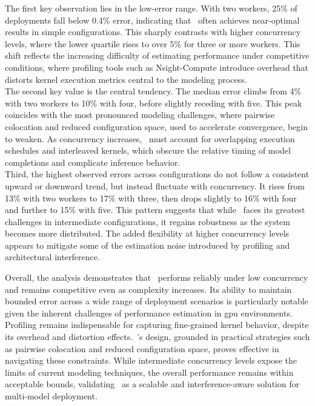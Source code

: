 The first key observation lies in the low-error range. With two workers, 25\% of deployments fall below 0.4\% error, indicating that~\roomie{} often achieves near-optimal results in simple configurations. This sharply contrasts with higher concurrency levels, where the lower quartile rises to over 5\% for three or more workers. This shift reflects the increasing difficulty of estimating performance under competitive conditions, where profiling tools such as Nsight-Compute introduce overhead that distorts kernel execution metrics central to the modeling process.\\
The second key value is the central tendency. The median error climbs from 4\% with two workers to 10\% with four, before slightly receding with five. This peak coincides with the most pronounced modeling challenges, where pairwise colocation and reduced configuration space, used to accelerate convergence, begin to weaken. As concurrency increases,~\roomie{} must account for overlapping execution schedules and interleaved kernels, which obscure the relative timing of model completions and complicate inference behavior.\\
Third, the highest observed errors across configurations do not follow a consistent upward or downward trend, but instead fluctuate with concurrency. It rises from 13\% with two workers to 17\% with three, then drops slightly to 16\% with four and further to 15\% with five. This pattern suggests that while~\roomie{} faces its greatest challenges in intermediate configurations, it regains robustness as the system becomes more distributed. The added flexibility at higher concurrency levels appears to mitigate some of the estimation noise introduced by profiling and architectural interference.

Overall, the analysis demonstrates that~\roomie{} performs reliably under low concurrency and remains competitive even as complexity increases. Its ability to maintain bounded error across a wide range of deployment scenarios is particularly notable given the inherent challenges of performance estimation in \acrshort{gpu} environments. Profiling remains indispensable for capturing fine-grained kernel behavior, despite its overhead and distortion effects.~\roomie's design, grounded in practical strategies such as pairwise colocation and reduced configuration space, proves effective in navigating these constraints. While intermediate concurrency levels expose the limits of current modeling techniques, the overall performance remains within acceptable bounds, validating~\roomie{} as a scalable and interference-aware solution for multi-model deployment.